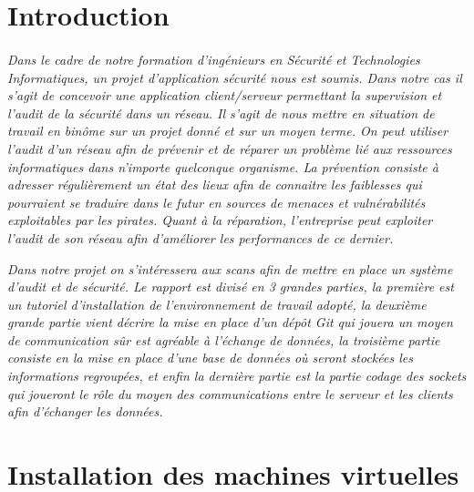 \documentclass[11pt,a4paper,titlepage, oneside]{article}
\begin{document}
\section*{{\color{red}Introduction}}
	\paragraph{}
		\textsl{Dans le cadre de notre formation d'ingénieurs en Sécurité et Technologies Informatiques, un projet d'application sécurité nous est soumis. Dans notre cas il s'agit de concevoir une application client/serveur permettant la supervision et l'audit de la sécurité dans un réseau. Il s'agit de nous mettre en situation de travail en binôme  sur un projet donné et sur un moyen terme. 
		On peut utiliser l'audit d'un réseau afin de prévenir et de réparer un problème lié aux ressources informatiques dans n'importe quelconque organisme. La prévention consiste à adresser régulièrement un état des lieux afin de connaitre les faiblesses qui pourraient se traduire dans le futur en sources de menaces et vulnérabilités exploitables par les pirates.
Quant à la réparation, l'entreprise peut exploiter l'audit de son réseau afin d'améliorer les performances de ce dernier. 	}	

\textsl{
Dans notre projet on s'intéressera aux scans afin de mettre en place un système d'audit et de sécurité.
Le rapport est divisé en 3 grandes parties, la première est un tutoriel d'installation de l'environnement de travail adopté, la deuxième grande partie vient décrire la mise en place d'un dépôt Git qui jouera un moyen de communication sûr est agréable à l'échange de données, la troisième partie consiste en la mise en place d'une base de données où seront stockées les informations regroupées, et enfin la dernière partie est la partie codage des sockets qui joueront le rôle du moyen des communications entre le serveur et les clients afin d'échanger les données.}
		
\newpage
\thispagestyle{empty}
\tableofcontents
\newpage
\listoffigures  %

\newpage
{} \setcounter{page}{1}
\section{{\color{red}Installation des machines virtuelles}}
\subsection{{\color{blue}{Installation du serveur Debian}}}
\end{document}
